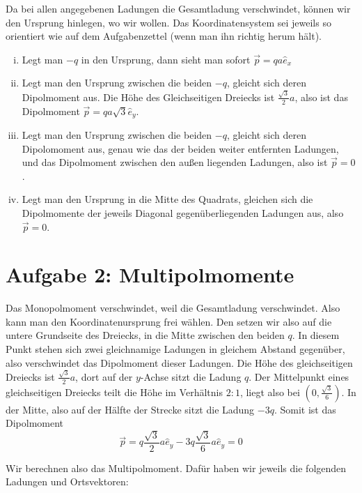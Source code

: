 \documentclass[a4paper,german,12pt,smallheadings]{scrartcl}
\begin{document}
\begin{enumerate}[a)]
    Da bei allen angegebenen Ladungen die Gesamtladung verschwindet, können wir
    den Ursprung hinlegen, wo wir wollen. Das Koordinatensystem sei jeweils so
    orientiert wie auf dem Aufgabenzettel (wenn man ihn richtig herum hält).
    \begin{enumerate}[(i)]
      \item
        Legt man $-q$ in den Ursprung, dann sieht man sofort $\vec{p} = q a \hat{e}_x$
      \item
        Legt man den Ursprung zwischen die beiden $-q$, gleicht sich deren
        Dipolmoment aus. Die Höhe des Gleichseitigen Dreiecks ist
        $\frac{\sqrt{3}}{2} a$, also ist das Dipolmoment $\vec{p} = q a \sqrt{3} \hat{e}_y$.
      \item
        Legt man den Ursprung zwischen die beiden $-q$, gleicht sich deren
        Dipolomoment aus, genau wie das der beiden weiter entfernten Ladungen,
        und das Dipolmoment zwischen den außen liegenden Ladungen, also ist
        $\vec{p} = 0$.
      \item
        Legt man den Ursprung in die Mitte des Quadrats, gleichen sich die
        Dipolmomente der jeweils Diagonal gegenüberliegenden Ladungen aus, also
        $\vec{p} = 0$.
    \end{enumerate}
\end{enumerate}
\section*{Aufgabe 2: Multipolmomente}
Das Monopolmoment verschwindet, weil die Gesamtladung verschwindet. Also kann
man den Koordinatenursprung frei wählen. Den setzen wir also auf die untere
Grundseite des Dreiecks, in die Mitte zwischen den beiden $q$. In diesem Punkt
stehen sich zwei gleichnamige Ladungen in gleichem Abstand gegenüber, also
verschwindet das Dipolmoment dieser Ladungen. Die Höhe des gleichseitigen
Dreiecks ist $\frac{\sqrt{3}}{2}a$, dort auf der $y$-Achse sitzt die Ladung
$q$. Der Mittelpunkt eines gleichseitigen Dreiecks teilt die Höhe im Verhältnis
$2:1$, liegt also bei $(0, \frac{\sqrt{3}}{6})$.
In der Mitte, also auf der Hälfte der Strecke sitzt die Ladung $-3q$. Somit ist
das Dipolmoment
\begin{equation}
  \vec{p} = q \frac{\sqrt{3}}{2} a \hat{e}_y - 3q \frac{\sqrt{3}}{6} a \hat{e}_y = 0
\end{equation}

Wir berechnen also das Multipolmoment. Dafür haben wir jeweils die folgenden
Ladungen und Ortsvektoren: %
\end{document}

